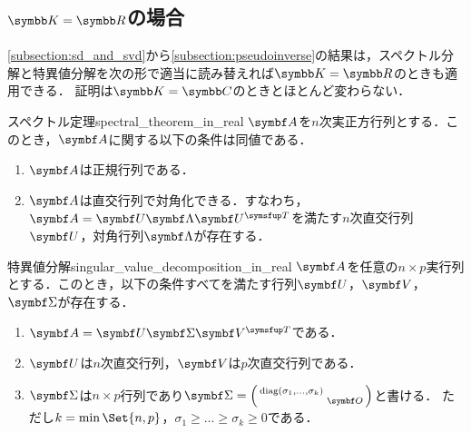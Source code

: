 \documentclass[../../main]{subfiles}
\begin{document}
\subsection{\texorpdfstring{\(\numset{K}=\numset{R}\)}{K=R}の場合}

\cref{subsection:sd_and_svd}から\cref{subsection:pseudoinverse}の結果は，スペクトル分解と特異値分解を次の形で適当に読み替えれば\(\numset{K}=\numset{R}\)のときも適用できる．
証明は\(\numset{K}=\numset{C}\)のときとほとんど変わらない．

\begin{theorem}{スペクトル定理}{spectral_theorem_in_real}
  \(\mat{A}\)を\(n\)次実正方行列とする．このとき，\(\mat{A}\)に関する以下の条件は同値である．
  \begin{enumerate}
    \item \(\mat{A}\)は正規行列である．
    \item \(\mat{A}\)は直交行列\footnotemark で対角化できる．すなわち，\(\mat{A}=\mat{U}\mat{\Lambda}\trps{\mat{U}}\)を満たす\(n\)次直交行列\(\mat{U}\)，対角行列\(\mat{\Lambda}\)が存在する．
  \end{enumerate}
\end{theorem}

\begin{corollary}{特異値分解}{singular_value_decomposition_in_real}
  \(\mat{A}\)を任意の\(n\times p\)実行列とする．このとき，以下の条件すべてを満たす行列\(\mat{U}\)，\(\mat{V}\)，\(\mat{\Sigma}\)が存在する．
  \begin{enumerate}
    \item \(\mat{A}=\mat{U}\mat{\Sigma}\trps{\mat{V}}\)である．
    \item \(\mat{U}\)は\(n\)次直交行列，\(\mat{V}\)は\(p\)次直交行列である．
    \item \(\mat{\Sigma}\)は\(n\times p\)行列であり\(\mat{\Sigma}=\smallmatrice{\diag(\sigma_1,\dots,\sigma_k) & \\ & \zmat}\)と書ける．
      ただし\(k=\min\Set{n,p}\)，\(\sigma_1\geq\dots\geq\sigma_k\geq 0\)である．
  \end{enumerate}
\end{corollary}

\end{document}
